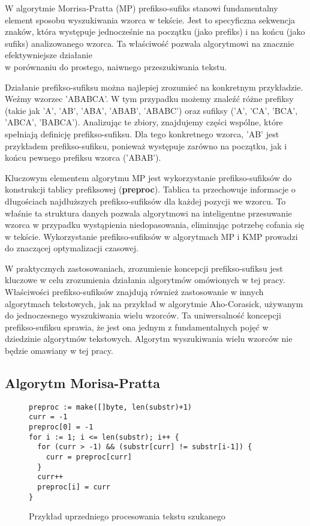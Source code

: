 W algorytmie Morrisa-Pratta (MP) prefikso-sufiks stanowi fundamentalny element 
sposobu wyszukiwania wzorca w tekście. Jest to specyficzna
sekwencja znaków, która występuje jednocześnie na początku (jako prefiks) i na
końcu (jako sufiks) analizowanego wzorca.
Ta właściwość pozwala algorytmowi na znacznie efektywniejsze
działanie \\ w porównaniu do prostego, naiwnego przeszukiwania tekstu.

Działanie prefikso-sufiksu można najlepiej zrozumieć na konkretnym przykładzie.
Weźmy wzorzec 'ABABCA'. W tym przypadku możemy znaleźć różne prefiksy (takie 
jak 'A', 'AB', 'ABA', 'ABAB', 'ABABC') oraz sufiksy ('A', 'CA', 'BCA', 'ABCA',
'BABCA'). Analizując te zbiory, znajdujemy części wspólne, które spełniają 
definicję prefikso-sufiksu. Dla tego konkretnego wzorca, 'AB' jest przykładem 
prefikso-sufiksu, ponieważ występuje zarówno na początku, jak i końcu pewnego 
prefiksu wzorca ('ABAB').

Kluczowym elementem algorytmu MP jest wykorzystanie prefikso-sufiksów do 
konstrukcji tablicy prefiksowej (\textbf{preproc}). Tablica ta przechowuje informacje o 
długościach najdłuższych prefikso-sufiksów dla każdej pozycji we wzorcu. To 
właśnie ta struktura danych pozwala algorytmowi na inteligentne przesuwanie 
wzorca w przypadku wystąpienia niedopasowania, eliminując potrzebę cofania się 
w tekście. Wykorzystanie prefikso-sufiksów w algorytmach MP i KMP prowadzi do znaczącej 
optymalizacji czasowej.

W praktycznych zastosowaniach, zrozumienie koncepcji prefikso-sufiksu jest 
kluczowe w celu zrozumienia działania algorytmów omówionych w tej pracy. 
Właściwości prefikso-sufiksów znajdują również zastosowanie w innych 
algorytmach tekstowych, jak na przykład w algorytmie Aho-Corasick, 
używanym do jednoczesnego wyszukiwania wielu wzorców. Ta uniwersalność 
koncepcji prefikso-sufiksu sprawia, że jest ona jednym z fundamentalnych 
pojęć w dziedzinie algorytmów tekstowych. Algorytm wyszukiwania
wielu wzorców nie będzie omawiany w tej pracy.

\subsection{Algorytm Morisa-Pratta}

\begin{figure}[htbp]
  \centering
  \begin{lstlisting}
preproc := make([]byte, len(substr)+1)
curr = -1
preproc[0] = -1
for i := 1; i <= len(substr); i++ {
  for (curr > -1) && (substr[curr] != substr[i-1]) {
    curr = preproc[curr]
  }
  curr++
  preproc[i] = curr
}
  \end{lstlisting}
  \caption{Przykład uprzedniego procesowania tekstu szukanego}
  \label{fig:code:preprocessMorisPratt}
\end{figure}

